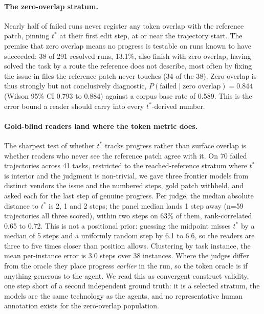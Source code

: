 \documentclass[sigconf,screen]{acmart}
\begin{document}
\paragraph{The zero-overlap stratum.} Nearly half of failed runs never register any token overlap
with the reference patch, pinning $t^{*}$ at their first edit step, at or near the trajectory
start. The premise that zero overlap
means no progress is testable on runs known to have succeeded: 38 of 291 resolved runs, 13.1\%,
also finish with zero overlap, having solved the task by a route the reference does not describe,
most often by fixing the issue in files the reference patch never touches (34 of the 38).
Zero overlap is thus strongly but not conclusively diagnostic,
$P(\text{failed} \mid \text{zero overlap}) = 0.844$ (Wilson 95\% CI 0.793 to 0.884) against a
corpus base rate of 0.589. This is the error bound a reader should carry into every $t^{*}$-derived
number.

\paragraph{Gold-blind readers land where the token metric does.} The sharpest test of whether
$t^{*}$ tracks progress rather than surface overlap is whether readers who never see the reference
patch agree with it. On 70 failed trajectories across 41 tasks, restricted to the reached-reference
stratum where $t^{*}$ is interior and the judgment is non-trivial, we gave three frontier models
from distinct vendors the issue and the numbered steps, gold patch withheld, and asked each for the
last step of genuine progress. Per judge, the median absolute distance to $t^{*}$ is 2, 1 and 2
steps; the panel median lands 1 step away (n=59 trajectories all three scored), within two steps on
63\% of them, rank-correlated 0.65 to 0.72. This is not a positional prior: guessing the midpoint
misses $t^{*}$ by a median of 5 steps and a uniformly random step by 6.1 to 6.6, so the readers are
three to five times closer than position allows. Clustering by task instance, the mean per-instance
error is 3.0 steps over 38 instances. Where the judges differ from the oracle they place progress
\emph{earlier} in the run, so the token oracle is if anything generous to the agent. We read this as
convergent construct validity, one step short of a second independent ground truth: it is a selected stratum,
the models are the same technology as the agents, and no representative human annotation exists for
the zero-overlap population.
\end{document}
